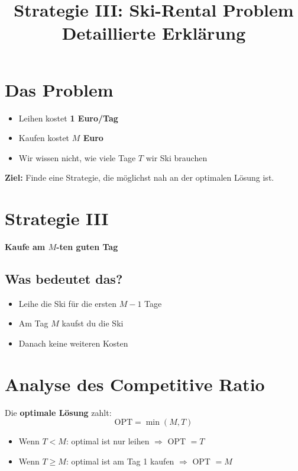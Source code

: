 \documentclass[12pt,a4paper]{article}
\title{Strategie III: Ski-Rental Problem\\
\large Detaillierte Erklärung}
\author{}
\date{}
\theoremstyle{definition}
\begin{document}
\maketitle

\section{Das Problem}

\begin{tcolorbox}[colback=blue!5!white,colframe=blue!75!black,title=Ski-Rental Problem]
\begin{itemize}
    \item Leihen kostet \textbf{1 Euro/Tag}
    \item Kaufen kostet \textbf{$M$ Euro}
    \item Wir wissen nicht, wie viele Tage $T$ wir Ski brauchen
\end{itemize}
\textbf{Ziel:} Finde eine Strategie, die möglichst nah an der optimalen Lösung ist.
\end{tcolorbox}

\section{Strategie III}

\begin{center}
\colorbox{yellow!50}{\large \textbf{Kaufe am $M$-ten guten Tag}}
\end{center}

\subsection{Was bedeutet das?}

\begin{itemize}[leftmargin=*]
    \item Leihe die Ski für die ersten $M-1$ Tage
    \item Am Tag $M$ kaufst du die Ski
    \item Danach keine weiteren Kosten
\end{itemize}

\section{Analyse des Competitive Ratio}

Die \textbf{optimale Lösung} zahlt:
\[
\text{OPT} = \min(M, T)
\]

\begin{itemize}
    \item Wenn $T < M$: optimal ist nur leihen $\Rightarrow$ OPT $= T$
    \item Wenn $T \geq M$: optimal ist am Tag 1 kaufen $\Rightarrow$ OPT $= M$
\end{itemize}
\end{document}
